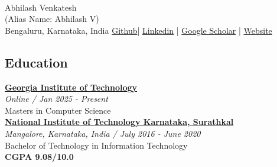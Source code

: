 \documentclass[a4paper,11pt]{article}
\begin{document}
\hspace{0.3cm}\\[-0.2cm]

\begin{center}      
    {\fontsize{16}{16}\selectfont Abhilash Venkatesh} \\ 
     (Alias Name: Abhilash V) \\
     Bengaluru, Karnataka, India \quad 
    \href {https://github.com/abhi4578}{Github}| \href {https://www.linkedin.com/in/abhi5782-/}{Linkedin} | \href {https://scholar.google.com/citations?user=8K_E_9EAAAAJ&hl=en}{Google Scholar} |
    \href{https://abhi4578.github.io}{Website}
\end{center}

\subsection*{Education}

\textbf{\href{https://omscs.gatech.edu/}{Georgia Institute of Technology}}\\
\textit{ Online /  Jan 2025 - Present} \\
Masters in Computer Science  \\
\newline
\textbf{\href{https://nitk.ac.in}{National Institute of Technology Karnataka, Surathkal}}\\
\textit{Mangalore, Karnataka, India / July 2016 - June 2020} \\
Bachelor of Technology in Information Technology  \\
\textbf{CGPA 9.08/10.0} 
\end{document}
